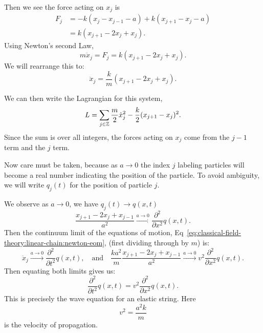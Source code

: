 Then we see the force acting on $x_{j}$ is
\begin{equation}
\begin{split}
  F_{j} &= -k(x_{j}-x_{j-1}-a) + k(x_{j+1}-x_{j}-a)\\
  &= k(x_{j+1}-2x_{j}+x_{j}).
\end{split}
\end{equation}
Using Newton's second Law,
\begin{equation}
m\ddot{x}_{j} = F_{j} = k(x_{j+1}-2x_{j}+x_{j}).
\end{equation}
We will rearrange this to:
\begin{equation}\label{eq:classical-field-theory:linear-chain:newton-eom}
\ddot{x}_{j} = \frac{k}{m}(x_{j+1}-2x_{j}+x_{j}).
\end{equation}


We can then write the Lagrangian for this system,
\begin{equation}\label{eq:classical-field-theory:linear-chain:lagrangian-with-point-masses}
L = \sum_{j\in\mathbb{Z}}\frac{m}{2}\dot{x}^{2}_{j} - \frac{k}{2}(x_{j+1}-x_{j})^{2}.
\end{equation}
Since the sum is over all integers, the forces acting on $x_{j}$ come
from the $j-1$ term and the $j$ term.

Now care must be taken, because as $a\to 0$ the index $j$ labeling
particles will become a real number indicating the position of the
particle. To avoid ambiguity, we will write $q_{j}(t)$ for the position
of particle $j$.

We observe as $a\to0$, we have $q_{j}(t)\to q(x,t)$
\begin{equation}
\frac{x_{j+1}-2x_{j}+x_{j-1}}{a^{2}}\xrightarrow{a\to0}\frac{\partial^{2}}{\partial x^{2}}q(x,t).
\end{equation}
Then the continuum limit of the equations of motion,
Eq~\eqref{eq:classical-field-theory:linear-chain:newton-eom}, (first
dividing through by $m$) is:
\begin{equation}
\ddot{x}_{j}\xrightarrow{a\to0}\frac{\partial^{2}}{\partial t^{2}}q(x,t),
\quad\mbox{and}\quad\frac{ka^{2}}{m}\frac{x_{j+1}-2x_{j}+x_{j-1}}{a^{2}}
\xrightarrow{a\to0}v^{2}
\frac{\partial^{2}}{\partial x^{2}}q(x,t).
\end{equation}
Then equating both limits gives us:
\begin{equation}
\frac{\partial^{2}}{\partial t^{2}}q(x,t) = v^{2}
\frac{\partial^{2}}{\partial x^{2}}q(x,t).
\end{equation}
This is precisely the wave equation for an elastic string.
Here
\begin{equation}\label{eq:classical-field-theory:linear-chain:speed-of-propagation}
v^{2} = \frac{a^{2}k}{m}
\end{equation}
is the velocity of propagation.

